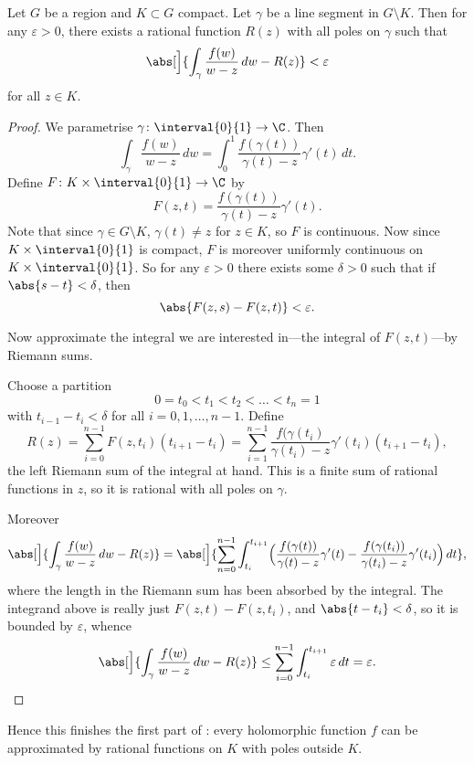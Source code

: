\begin{lemma}\label{lem10.2}
	Let $G$ be a region and $K \subset G$ compact.
	Let $\gamma$ be a line segment in $G \setminus K$.
	Then for any $\varepsilon > 0$, there exists a rational function $R(z)$ with all poles on $\gamma$ such that
	\[
		\abs[\Big]{\int_\gamma \frac{f(w)}{w -z} \, d w - R(z)} < \varepsilon
	\]
	for all $z \in K$.
\end{lemma}

\begin{proof}
	We parametrise $\gamma \colon \interval{0}{1} \to \C$.
	Then
	\[
		\int_\gamma \frac{f(w)}{w - z} \, d w = \int_0^1 \frac{f(\gamma(t))}{\gamma(t) - z} \gamma'(t) \, d t.
	\]
	Define $F \colon K \times \interval{0}{1} \to \C$ by
	\[
		F(z, t) = \frac{f(\gamma(t))}{\gamma(t) - z} \gamma'(t).
	\]
	Note that since $\gamma \in G \setminus K$, $\gamma(t) \neq z$ for $z \in K$, so $F$ is continuous.
	Now since $K \times \interval{0}{1}$ is compact, $F$ is moreover uniformly continuous on $K \times \interval{0}{1}$.
	So for any $\varepsilon > 0$ there exists some $\delta > 0$ such that if $\abs{s - t} < \delta$, then
	\[
		\abs{F(z, s) - F(z, t)} < \varepsilon.
	\]

	Now approximate the integral we are interested in---the integral of $F(z, t)$---by Riemann sums.

	Choose a partition
	\[
		0 = t_0 < t_1 < t_2 < \dots < t_n = 1
	\]
	with $t_{i - 1} - t_i < \delta$ for all $i = 0, 1, \dots, n - 1$.
	Define
	\[
		R(z) = \sum_{i = 0}^{n - 1} F(z, t_i) (t_{i + 1} - t_i) = \sum_{i = 1}^{n - 1} \frac{f(\gamma(t_i)}{\gamma(t_i) - z} \gamma'(t_i) (t_{i + 1} - t_i),
	\]
	the left Riemann sum of the integral at hand.
	This is a finite sum of rational functions in $z$, so it is rational with all poles on $\gamma$.

	Moreover
	\[
		\abs[\Big]{\int_\gamma \frac{f(w)}{w - z} \, d w - R(z)} = \abs[\Big]{\sum_{n = 0}^{n - 1} \int_{t_i}^{t_{i + 1}} \Bigl ( \frac{f(\gamma(t))}{\gamma(t) - z} \gamma'(t) - \frac{f(\gamma(t_i))}{\gamma(t_i) - z} \gamma'(t_i) \Bigr) \, d t},
	\]
	where the length in the Riemann sum has been absorbed by the integral.
	The integrand above is really just $F(z, t) - F(z, t_i)$, and $\abs{t - t_i} < \delta$, so it is bounded by $\varepsilon$, whence
	\[
		\abs[\Big]{\int_\gamma \frac{f(w)}{w - z} \, d w - R(z)} \leq \sum_{i = 0}^{n - 1} \int_{t_i}^{t_{i + 1}} \varepsilon \, d t = \varepsilon. \qedhere
	\]
\end{proof}

Hence this finishes the first part of : every holomorphic function $f$ can be approximated by rational functions on $K$ with poles outside $K$.

